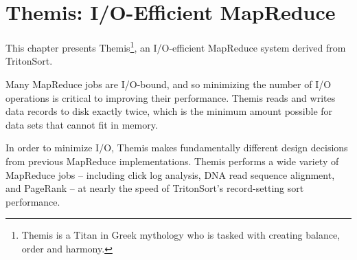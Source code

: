 \chapter{Themis: I/O-Efficient MapReduce}
\label{chapter:themis}

This chapter presents Themis\footnote{Themis is a Titan in Greek mythology who
  is tasked with creating balance, order and harmony.}, an I/O-efficient
MapReduce system derived from TritonSort.

Many MapReduce jobs are I/O-bound, and so minimizing the number of I/O
operations is critical to improving their performance. Themis reads and writes
data records to disk exactly twice, which is the minimum amount possible for
data sets that cannot fit in memory.

In order to minimize I/O, Themis makes fundamentally different design decisions
from previous MapReduce implementations. Themis performs a wide variety of
MapReduce jobs -- including click log analysis, DNA read sequence alignment,
and PageRank -- at nearly the speed of TritonSort's record-setting sort
performance.









